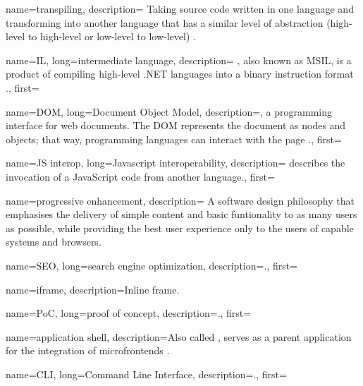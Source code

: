 {
    name=transpiling, 
    description={
        Taking source code written in one language and transforming into another
    language that has a similar level of abstraction (high-level to
    high-level or low-level to low-level) \autocite{Fenton_2012}.
    }
}

{
    name=IL,
    long={intermediate language},
    description={
    , also known as MSIL, is a product of compiling high-level
    .NET languages into a binary instruction format \autocite{Microsoft_2016}.},
    first=
}

{
    name=DOM, 
    long={Document Object Model}, 
    description={, a programming interface for web documents.
    The DOM represents the document as nodes and objects; that way, programming
    languages can interact with the page \autocite{Mozilla_DOM}.}, 
    first=}

{
    name={JS interop},
    long={Javascript interoperability},
    description={ describes the invocation of a
    JavaScript code from another language.},
    first=
}

{
    name={progressive enhancement},
    description={
    A software design philosophy that emphasises the delivery of simple content
    and basic funtionality to as many users as possible, while providing the
    best user experience only to the users of capable systems and browsers.
    }
}

{
    name=SEO,
    long={search engine optimization},
    description={.},
    first=
}

{
    name=iframe,
    description={Inline frame.}
}

{
    name=PoC,
    long={proof of concept},
    description={.},
    first=
}

{
    name={application shell},
    description={Also called , serves as a parent application
    for the integration of microfrontends \autocite{Geers_2020}\autocite{Rappl_2021}.}
}

{
    name=CLI,
    long={Command Line Interface},
    description={.},
    first=
}

